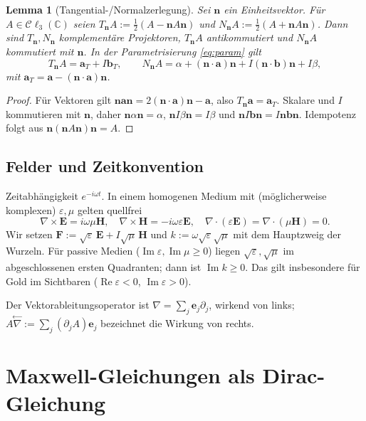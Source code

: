 \documentclass[11pt, a4paper]{article}
\newcommand{\mvec}[1]{\boldsymbol{#1}}
\newcommand{\clc}{\mathcal{C}\ell_{3}(\mathbb{C})}
\newcommand{\n}{\mvec{n}}
\theoremstyle{plain}
\newtheorem{lemma}[satz]{Lemma}
\theoremstyle{definition}
\newcommand{\status}[1]{\hfill{\small\sffamily[#1]}}
\begin{document}
\begin{lemma}[Tangential-/Normalzerlegung]\label{lem:TN}\status{bewiesen}
Sei $\n$ ein Einheitsvektor. Für $A\in\clc$ seien
$T_{\n}A := \tfrac12(A - \n A\n)$ und $N_{\n}A := \tfrac12(A + \n A\n)$.
Dann sind $T_{\n}, N_{\n}$ komplementäre Projektoren, $T_{\n} A$ antikommutiert und
$N_{\n} A$ kommutiert mit $\n$. In der Parametrisierung \eqref{eq:param} gilt
\[
  T_{\n} A = \mvec{a}_T + I\mvec{b}_T,\qquad N_{\n} A = \alpha + (\n\cdot\mvec{a})\n +
  I(\n\cdot\mvec{b})\n + I\beta,
\]
mit $\mvec{a}_T = \mvec{a}-(\n\cdot\mvec{a})\n$.
\end{lemma}
\begin{proof}
Für Vektoren gilt $\n\mvec{a}\n = 2(\n\cdot\mvec{a})\n - \mvec{a}$, also
$T_{\n}\mvec{a}=\mvec{a}_T$. Skalare und $I$ kommutieren mit $\n$, daher
$\n\alpha\n=\alpha$, $\n I\beta\n = I\beta$ und $\n I\mvec{b}\n = I\n\mvec{b}\n$.
Idempotenz folgt aus $\n(\n A\n)\n = A$.
\end{proof}

\subsection{Felder und Zeitkonvention}
Zeitabhängigkeit $e^{-i\omega t}$. In einem homogenen Medium mit (möglicherweise
komplexen) $\varepsilon,\mu$ gelten quellfrei
\begin{equation}\label{eq:maxwell}
  \nabla\times\mvec{E} = i\omega\mu\mvec{H},\quad
  \nabla\times\mvec{H} = -i\omega\varepsilon\mvec{E},\quad
  \nabla\cdot(\varepsilon\mvec{E}) = \nabla\cdot(\mu\mvec{H}) = 0.
\end{equation}
Wir setzen $\mvec{F} := \sqrt{\varepsilon}\,\mvec{E} + I\sqrt{\mu}\,\mvec{H}$ und
$k := \omega\sqrt{\varepsilon}\sqrt{\mu}$ mit dem Hauptzweig der Wurzeln. Für
passive Medien ($\operatorname{Im}\varepsilon,\operatorname{Im}\mu\ge0$) liegen
$\sqrt\varepsilon,\sqrt\mu$ im abgeschlossenen ersten Quadranten; dann ist
$\operatorname{Im}k\ge0$. Das gilt insbesondere für Gold im Sichtbaren
($\operatorname{Re}\varepsilon<0$, $\operatorname{Im}\varepsilon>0$).

Der Vektorableitungsoperator ist $\nabla = \sum_j \mvec{e}_j\partial_j$, wirkend
von links; $A\overset{\leftarrow}{\nabla} := \sum_j (\partial_j A)\mvec{e}_j$
bezeichnet die Wirkung von rechts.

\section{Maxwell-Gleichungen als Dirac-Gleichung}
\end{document}
